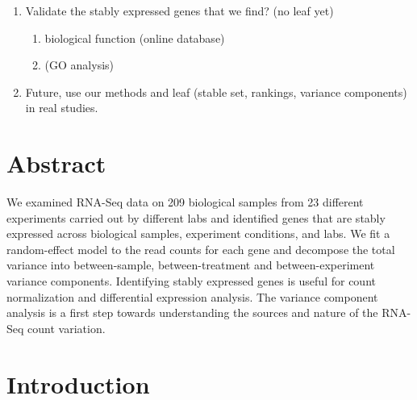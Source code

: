 \documentclass[11pt, a4paper]{article}
\begin{document}
\begin{enumerate}
    \item
	Validate the stably expressed genes that we find? (no leaf yet) 
	\begin{enumerate}
	    \item
		biological function (online database) 
	    \item
		(GO analysis)
	\end{enumerate}

    \item
	Future, use our methods and leaf (stable set, rankings, variance
	components) in real studies.
\end{enumerate}

\newpage
\maketitle

\section*{Abstract}
We examined RNA-Seq data on 209 biological samples from 23 different
experiments carried out by different labs and identified genes that are stably
expressed across biological samples, experiment conditions, and labs. We fit a
random-effect model to the read counts for each gene and decompose the total
variance into between-sample, between-treatment and between-experiment variance
components. Identifying stably expressed genes is useful for count
normalization and differential expression analysis. The variance component analysis is a first step towards
understanding the sources and nature of the RNA-Seq count variation.


\section{Introduction}\label{section:Introduction}
\end{document}
